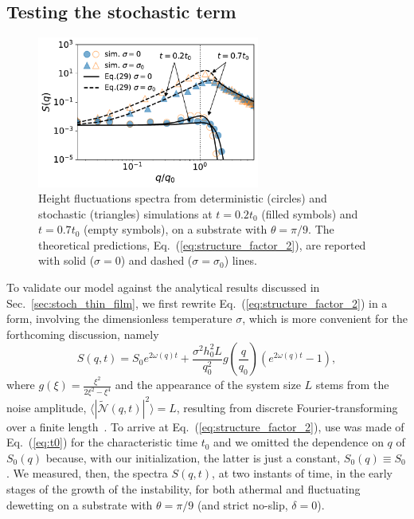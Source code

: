 \subsection{Testing the stochastic term}\label{subsec:validation}
\begin{figure}
    \centering
    \includegraphics[width=0.65\textwidth]{graphics/spectrum_theta_20_nob_fill_pattern.pdf}
    \caption{Height fluctuations spectra from deterministic (circles) and stochastic (triangles) simulations at $t=0.2 t_0$ (filled symbols) and $t=0.7 t_0$ (empty symbols), on a substrate with $\theta =\pi/9$. 
    The theoretical predictions, Eq.~(\ref{eq:structure_factor_2}), are reported with solid ($\sigma=0$) and dashed ($\sigma = \sigma_0$) lines.}
    \label{fig:theory_simulation_structure_factor}
\end{figure}
To validate our model against the analytical results discussed in Sec.~\ref{sec:stoch_thin_film}, we first rewrite Eq.~(\ref{eq:structure_factor_2}) in a form, involving the dimensionless temperature $\sigma$, which is more convenient for the forthcoming discussion, namely
\begin{equation}\label{eq:structure_factor_2}
    S(q,t) = S_0 e^{2\omega(q)t} + \frac{\sigma^2 h_0^2 L}{q_0^2}g\left(\frac{q}{q_0}\right)(e^{2\omega(q)t} - 1),
\end{equation}
where $g(\xi) = \frac{\xi^2}{2\xi^2 - \xi^4}$ and the appearance of the system size $L$ stems from the noise amplitude, $\langle |\tilde{\mathcal{N}}(q,t)|^2 \rangle = L$, resulting from discrete Fourier-transforming over a finite length~\cite{zhangMolecularSimulationThin2019,zhangNanoscaleThinfilmFlows2020}. 
To arrive at Eq.~(\ref{eq:structure_factor_2}), use was made of Eq.~(\ref{eq:t0}) for the characteristic time $t_0$ and we omitted the dependence on $q$ of $S_0(q)$ because, with our initialization, the latter is just a constant, $S_0(q)\equiv S_0$.
We measured, then, the spectra $S(q,t)$, at two instants of time, in the early stages of the growth of the instability, for both athermal and fluctuating dewetting on a substrate with $\theta=\pi/9$ (and strict no-slip, $\delta=0$).
